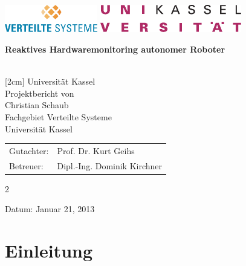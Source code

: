 \documentclass[
	11pt,								%
	a4paper,						%
	oneside,						%
	titlepage,					%
	headsepline,				%
	DIV13,							%
	abstracton,	 				%
	BCOR0cm,						%
	bibliography=totoc, %
]{scrreprt}							%
\begin{document}
	\thispagestyle{empty}
	\includegraphics[height=1.2cm]{images/vsLogo.png}
	\hfill\includegraphics[height=1.2cm]{images/uniLogo.pdf}\\[1cm]

	\begin{center}
		\begin{LARGE}\bfseries Reaktives Hardwaremonitoring autonomer Roboter \end{LARGE}\\
		[2cm]
		\Large{Universität Kassel}\\
		[1cm]
		\large{Projektbericht von}\\
		\Large{Christian Schaub}\\
		[1cm]
		\large \Large{Fachgebiet Verteilte Systeme \\
		Universität Kassel}\\
		[1cm]
	\end{center}
	


	\vfill
	\begin{Large}
		\begin{tabular}{l l}
			Gutachter: & Prof. Dr. Kurt Geihs\\
			[1cm]
			Betreuer: & Dipl.-Ing. Dominik Kirchner\\
		\end{tabular}
	\end{Large}
	\vfill2

	\begin{center}Datum: Januar 21, 2013\end{center}

	

	\tableofcontents

	
\chapter{Einleitung}
\label{cha:Einleitung}
\end{document}
